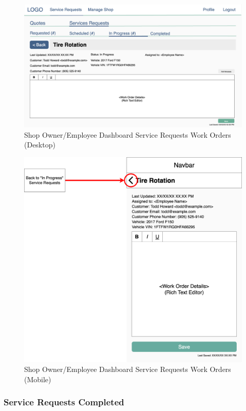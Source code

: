 \documentclass[12pt, titlepage]{article}
\begin{document}
\begin{figure}[H]
	\centering
	\includegraphics[width=\textwidth]{mockups/Shop Owner-Employee Work Order (Desktop).png}
	\caption{Shop Owner/Employee Dashboard \textemdash{} Service Requests \textemdash{} Work Orders (Desktop)}
\end{figure}

\begin{figure}[H]
	\centering
	\includegraphics[width=\textwidth]{mockups/Shop Owner-Employee Work Order (Mobile).png}
	\caption{Shop Owner/Employee Dashboard \textemdash{} Service Requests \textemdash{} Work Orders (Mobile)}
\end{figure}

\subsubsection{Service Requests \textemdash{} Completed}
\end{document}
